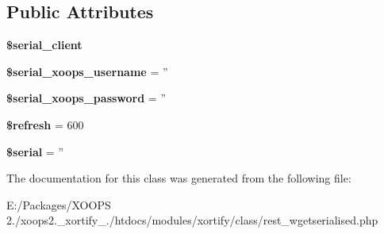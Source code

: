 \subsection*{Public Attributes}
\begin{DoxyCompactItemize}
\item 
\hypertarget{class_r_e_s_t___w_g_e_t_s_e_r_i_a_l_i_s_e_d_xortify_exchange_aa528598a1ca389ab47b1ff219230e423}{{\bfseries \$serial\-\_\-client}}\label{class_r_e_s_t___w_g_e_t_s_e_r_i_a_l_i_s_e_d_xortify_exchange_aa528598a1ca389ab47b1ff219230e423}

\item 
\hypertarget{class_r_e_s_t___w_g_e_t_s_e_r_i_a_l_i_s_e_d_xortify_exchange_af0fe4bb90e809119f4924c2bb94dd267}{{\bfseries \$serial\-\_\-xoops\-\_\-username} = ''}\label{class_r_e_s_t___w_g_e_t_s_e_r_i_a_l_i_s_e_d_xortify_exchange_af0fe4bb90e809119f4924c2bb94dd267}

\item 
\hypertarget{class_r_e_s_t___w_g_e_t_s_e_r_i_a_l_i_s_e_d_xortify_exchange_aef2783630d5b291f971c886265179a78}{{\bfseries \$serial\-\_\-xoops\-\_\-password} = ''}\label{class_r_e_s_t___w_g_e_t_s_e_r_i_a_l_i_s_e_d_xortify_exchange_aef2783630d5b291f971c886265179a78}

\item 
\hypertarget{class_r_e_s_t___w_g_e_t_s_e_r_i_a_l_i_s_e_d_xortify_exchange_a0a8e3a3697929e52519076f9f19b5caf}{{\bfseries \$refresh} = 600}\label{class_r_e_s_t___w_g_e_t_s_e_r_i_a_l_i_s_e_d_xortify_exchange_a0a8e3a3697929e52519076f9f19b5caf}

\item 
\hypertarget{class_r_e_s_t___w_g_e_t_s_e_r_i_a_l_i_s_e_d_xortify_exchange_aca23b48462d5f0fad64ef682b0755e9c}{{\bfseries \$serial} = ''}\label{class_r_e_s_t___w_g_e_t_s_e_r_i_a_l_i_s_e_d_xortify_exchange_aca23b48462d5f0fad64ef682b0755e9c}

\end{DoxyCompactItemize}


The documentation for this class was generated from the following file\-:\begin{DoxyCompactItemize}
\item 
E\-:/\-Packages/\-X\-O\-O\-P\-S 2./xoops2.\-\_\-xortify\-\_./htdocs/modules/xortify/class/rest\-\_\-wgetserialised.\-php\end{DoxyCompactItemize}
